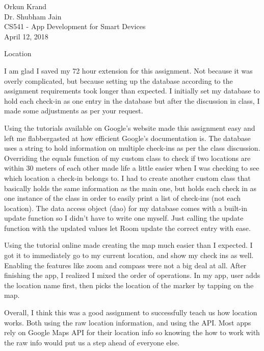 \documentclass{article}
\begin{document}
\raggedright

Orkun Krand \\ Dr. Shubham Jain \\ CS541 - App Development for Smart Devices \\ April 12, 2018
    
    
	\centerline{Location} 

I am glad I saved my 72 hour extension for this assignment. Not because it was overly complicated, but because setting up the database according to the assignment requirements took longer than expected. I initially set my database to hold each check-in as one entry in the database but after the discussion in class, I made some adjustments as per your request.
\hfill \linebreak

Using the tutorials available on Google's website made this assignment easy and left me flabbergasted at how efficient Google's documentation is. The database  uses a string to hold information on multiple check-ins as per the class discussion. Overriding the equals function of my custom class to check if two locations are within 30 meters of each other made life a little easier when I was checking to see which location a check-in belongs to. I had to create another custom class that basically holds the same information as the main one, but holds each check in as one instance of the class in order to easily print a list of check-ins (not each location). The data access object (dao) for my database comes with a built-in update function so I didn't have to write one myself. Just calling the update function with the updated values let Room update the correct entry with ease.
\hfill \linebreak

Using the tutorial online made creating the map much easier than I expected. I got it to immediately go to my current location, and show my check ins as well. Enabling the features like zoom and compass were not a big deal at all. After finishing the app, I realized I mixed the order of operations. In my app, user adds the location name first, then picks the location of the marker by tapping on the map. 
\hfill \linebreak

Overall, I think this was a good assignment to successfully teach us how location works. Both using the raw location information, and using the API. Most apps rely on Google Maps API for their location info so knowing the how to work with the raw info would put us a step ahead of everyone else.
\hfill \linebreak
\end{document}
